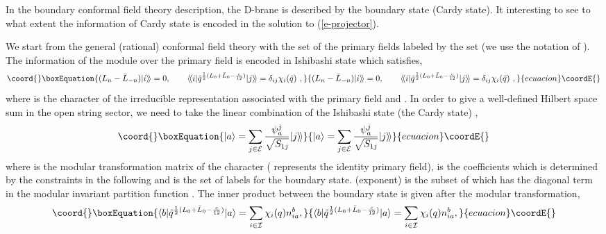 \documentclass[a4paper,12pt]{article}
\begin{document}
In the boundary conformal field theory description,
the D-brane is described by the boundary state (Cardy state).
It interesting to see to what extent the information of 
Cardy state is encoded in the solution to (\ref{e-projector}).

We start from the general (rational) conformal field theory
with the set of the primary fields \coordHE{} labeled by the set 
\coordHE{} (we use the notation of \cite{r-BPPZ}).
The information of the module over the primary field
is encoded in
Ishibashi state \cite{r-Ishibashi}\coordHE{}
which satisfies,
\begin{equation}\coord{}\boxEquation{
 (L_n-\bar L_{-n})|i\rangle\!\rangle=0,
\qquad
 \langle\!\langle i| \tilde q^{\frac{1}{2}(L_0+\bar L_0 -\frac{c}{12})}
|j\rangle\!\rangle
= \delta_{ij}\chi_i(\tilde q)\,\,,
}{
 (L_n-\bar L_{-n})|i\rangle\!\rangle=0,
\qquad
 \langle\!\langle i| \tilde q^{\frac{1}{2}(L_0+\bar L_0 -\frac{c}{12})}
|j\rangle\!\rangle
= \delta_{ij}\chi_i(\tilde q)\,\,,
}{ecuacion}\coordE{}\end{equation}
where \coordHE{} is the character of the irreducible
representation associated with the primary field \coordHE{}
and \coordHE{}.  In order to give a well-defined 
Hilbert space sum in the open string sector, we need to take
the linear combination of the Ishibashi state (the Cardy state)
\cite{r-Cardy},
\begin{equation}\coord{}\boxEquation{\label{e-Cardy}
 |a\rangle =\sum_{j\in {\cal E}} \frac{\psi^j_a}{\sqrt{S_{1j}}}
 |j\rangle\!\rangle
}{|a\rangle =\sum_{j\in {\cal E}} \frac{\psi^j_a}{\sqrt{S_{1j}}}
 |j\rangle\!\rangle
}{ecuacion}\coordE{}\end{equation}
where \coordHE{} is the modular transformation matrix of the
character (\coordHE{} represents the identity primary field),
\coordHE{} is the coefficients which is determined by the
constraints in the following and \coordHE{} is
the set of labels for the boundary state.
\coordHE{} (exponent) is the subset of \coordHE{} 
which has the diagonal term in the modular invariant partition
function \cite{r-BPPZ}.
The inner product between the boundary state is given 
after the modular transformation,
\begin{equation}\coord{}\boxEquation{\label{e-openstringsector}
 \langle b | \tilde q^{\frac{1}{2}(L_0+\bar L_0-\frac{c}{12})}
|a\rangle =\sum_{i\in{\cal I}} \chi_i(q)n_{ia}^b,
}{\langle b | \tilde q^{\frac{1}{2}(L_0+\bar L_0-\frac{c}{12})}
|a\rangle =\sum_{i\in{\cal I}} \chi_i(q)n_{ia}^b,
}{ecuacion}\coordE{}\end{equation}
\end{document}
